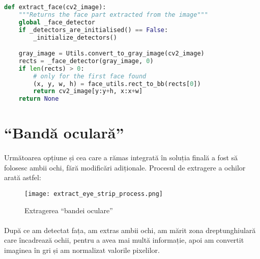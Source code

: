 \begin{lstlisting}[language=Python, caption=Extragerea feței dintr-o imagine]
def extract_face(cv2_image):
    """Returns the face part extracted from the image"""
    global _face_detector
    if _detectors_are_initialised() == False:
        _initialize_detectors()

    gray_image = Utils.convert_to_gray_image(cv2_image)
    rects = _face_detector(gray_image, 0)
    if len(rects) > 0:
        # only for the first face found
        (x, y, w, h) = face_utils.rect_to_bb(rects[0])
        return cv2_image[y:y+h, x:x+w]
    return None
\end{lstlisting}

\section{``Bandă oculară''}
\paragraph{}
Următoarea opțiune și cea care a rămas integrată în soluția finală a fost să folosesc ambii ochi, fără modificări adiționale.
Procesul de extragere a ochilor arată astfel:

\begin{figure}[h]
    \centering
    \texttt{[image: extract\_eye\_strip\_process.png]}
    \caption{Extragerea ``bandei oculare''}
    \label{fig_extracting_eye_strip}
\end{figure}

\paragraph{}
După ce am detectat fața, am extras ambii ochi, am mărit zona dreptunghiulară care încadrează ochii, pentru a avea mai multă informație, apoi am convertit imaginea în gri și am normalizat valorile pixelilor.

